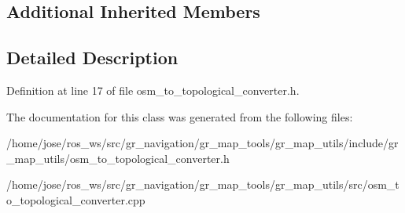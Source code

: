 \subsection*{Additional Inherited Members}


\subsection{Detailed Description}


Definition at line 17 of file osm\+\_\+to\+\_\+topological\+\_\+converter.\+h.



The documentation for this class was generated from the following files\+:\begin{DoxyCompactItemize}
\item 
/home/jose/ros\+\_\+ws/src/gr\+\_\+navigation/gr\+\_\+map\+\_\+tools/gr\+\_\+map\+\_\+utils/include/gr\+\_\+map\+\_\+utils/osm\+\_\+to\+\_\+topological\+\_\+converter.\+h\item 
/home/jose/ros\+\_\+ws/src/gr\+\_\+navigation/gr\+\_\+map\+\_\+tools/gr\+\_\+map\+\_\+utils/src/osm\+\_\+to\+\_\+topological\+\_\+converter.\+cpp\end{DoxyCompactItemize}
